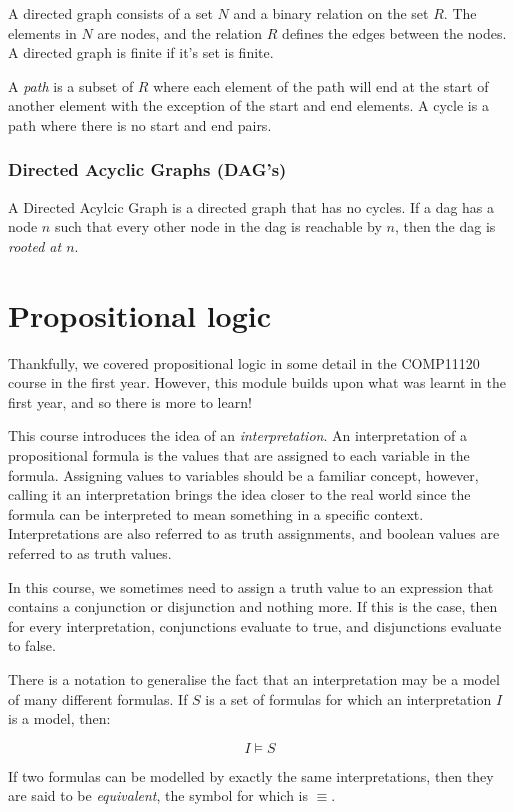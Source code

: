 A directed graph consists of a set $N$ and a binary relation on the set $R$. The
elements in $N$ are nodes, and the relation $R$ defines the edges between the
nodes. A directed graph is finite if it's set is finite.

A \textit{path} is a subset of $R$ where each element of the path will end at
the start of another element with the exception of the start and end elements. A
cycle is a path where there is no start and end pairs.

\subsubsection{Directed Acyclic Graphs (DAG's)}

A Directed Acylcic Graph is a directed graph that has no cycles. If a dag has a
node $n$ such that every other node in the dag is reachable by $n$, then the dag
is \textit{rooted at $n$}.


\section{Propositional logic}

Thankfully, we covered propositional logic in some detail in the COMP11120
course in the first year. However, this module builds upon what was learnt in
the first year, and so there is more to learn!

This course introduces the idea of an \textit{interpretation}. An interpretation
of a propositional formula is the values that are assigned to each variable in
the formula. Assigning values to variables should be a familiar concept,
however, calling it an interpretation brings the idea closer to the real world
since the formula can be interpreted to mean something in a specific context.
Interpretations are also referred to as truth assignments, and boolean values
are referred to as truth values.

In this course, we sometimes need to assign a truth value to an expression that
contains a conjunction or disjunction and nothing more. If this is the case,
then for every interpretation, conjunctions evaluate to true, and disjunctions
evaluate to false.

There is a notation to generalise the fact that an interpretation may be a model
of many different formulas. If $S$ is a set of formulas for which an
interpretation $I$ is a model, then:

\[
  I \models S
\]

If two formulas can be modelled by exactly the same interpretations, then they
are said to be \textit{equivalent}, the symbol for which is $\equiv$.

